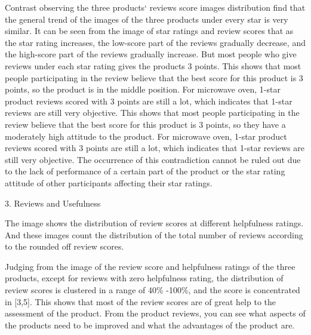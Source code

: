 \documentclass[12pt]{article}
\begin{document}
Contrast observing the three products` reviews score images distribution find that the general trend of the images of the three products under every star is very similar. It can be seen from the image of star ratings and review scores that as the star rating increases, the low-score part of the reviews  gradually decrease, and the high-score part of the reviews gradually increase. But most people who give reviews under each star rating gives the products 3 points. This shows that most people participating in the review believe that the best score for this product is 3 points, so the product is in the middle position. For microwave oven, 1-star product reviews scored with 3 points are still a lot, which indicates that 1-star reviews are still very objective. This shows that most people participating in the review believe that the best score for this product is 3 points, so they have a moderately high attitude to the product. For microwave oven, 1-star product reviews scored with 3 points are still a lot, which indicates that 1-star reviews are still very objective. The occurrence of this contradiction cannot be ruled out due to the lack of performance of a certain part of the product or the star rating attitude of other participants affecting their star ratings.
\par
3. Reviews and Usefulness
\par\quad\par\quad\par\quad\par\quad\par\quad\par\quad\par\quad\par\quad\par\quad\par\quad\par
The image shows the distribution of review scores at different helpfulness ratings. And these images count the distribution of the total number of reviews according to the rounded off review scores.
\par
Judging from the image of the review score and helpfulness ratings of the three products, except for reviews with zero helpfulness rating, the distribution of review scores is clustered in a range of 40\% -100\%, and the score is concentrated in [3,5]. This shows that most of the review scores are of great help to the assessment of the product. From the product reviews, you can see what aspects of the products need to be improved and what the advantages of the product are.
\end{document}
